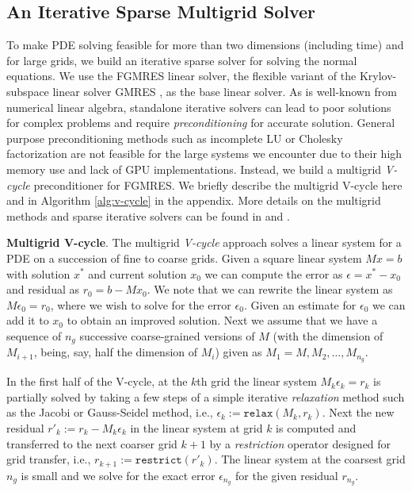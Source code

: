 \subsection{An Iterative Sparse Multigrid Solver}
To make PDE solving feasible for more than two dimensions (including time) and for large grids, we build an iterative sparse solver for solving the normal equations.
We use the FGMRES linear solver, the flexible variant of the Krylov-subspace linear solver GMRES \cite{saad1986gmres}, as the base linear solver.
As is well-known from numerical linear algebra, standalone iterative solvers can lead to poor solutions for complex problems and require \emph{preconditioning} for accurate solution.
General purpose preconditioning methods such as incomplete LU or Cholesky factorization are not feasible for the large systems we encounter due to their high memory use and lack of GPU implementations.
Instead, we build a multigrid \emph{V-cycle} preconditioner for FGMRES. 
We briefly describe the multigrid V-cycle here and in Algorithm \ref{alg:v-cycle} in the appendix. 
More details on the multigrid methods and sparse iterative solvers can be found in \citet{saad2003iterative} and \citet{briggs2000multigrid}.

\textbf{Multigrid V-cycle}. The multigrid \emph{V-cycle} approach solves a linear system for a PDE on a succession of fine to coarse grids.
Given a square linear system $Mx = b$ with solution $x^*$ and current solution $x_0$  we can compute the error as $\epsilon = x^* - x_0$ and residual as $r_0 = b - Mx_0$.
We note that we can rewrite the linear system as $M\epsilon_0 = r_0$, where we wish to solve for the error $\epsilon_0$.
Given an estimate for $\epsilon_0$ we can add it to $x_0$ to obtain an improved solution.
Next we assume that we have a sequence of $n_g$ successive coarse-grained versions of $M$ (with the dimension of $M_{i+1}$, being, say, half the dimension of $M_i$) given as $M_1=M, M_2, \ldots, M_{n_g}$.

In the first half of the V-cycle, at the $k$th grid the linear system $M_{k}\epsilon_{k} = r_{k}$ is partially solved by taking a few steps of a simple iterative \emph{relaxation} method such as the Jacobi or Gauss-Seidel method, i.e., $\epsilon_{k} := \texttt{relax}(M_k, r_k)$.
Next the new residual $r'_k:= r_k - M_k \epsilon_k$ in the linear system at grid $k$ is computed  and transferred to the next coarser grid $k+1$ by a \emph{restriction} operator designed for grid transfer, i.e., $r_{k+1} := \texttt{restrict}(r'_k)$. 
The linear system at the coarsest grid $n_g$ is small and we solve for the exact error $\epsilon_{n_g}$ for the given residual $r_{n_g}$.

